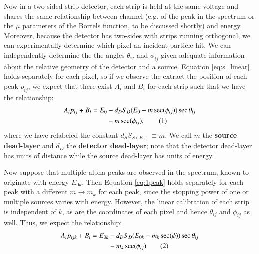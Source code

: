 \documentclass[11pt]{article}
\newcommand{\eqrefn}[1]{Equation \ref{eq:#1}}
\newcommand\numberthis{\addtocounter{equation}{1}\tag{\theequation}}
\begin{document}
\begin{multicols}{2}
Now in a two-sided strip-detector, each strip is held at the same voltage and shares the same relationship between channel (e.g. of the peak in the spectrum or the $\mu$ parameters of the Bortels function, to be discussed shortly) and energy. Moreover, because the detector has two-sides with strips running orthogonal, we can experimentally determine which pixel an incident particle hit. We can independently determine the  the angles $\theta_{ij}$ and $\phi_{ij}$ given adequate information about the relative geometry of the detector and a source. \eqrefn{s_linear} holds separately for each pixel, so if we observe the extract the position of each peak $p_{ij}$, we expect that there exist $A_i$ and $B_i$ for each strip such that we have the relationship:
	\begin{align*}
 		A_i p_{ij} + B_i = E_0  &-  d_D  S_D( E_0 - m \sec (\phi _{ij}) ) \sec \theta_{ij}
			\\ &- m  \sec (\phi_{ij}) ,
				  \numberthis \label{eq:1peak}
	\end{align*}	
where we have relabeled the constant $ d_S S_{S(E_0)} \equiv m $. We call $m$ the \textbf{source dead-layer} and $d_D$ the \textbf{detector dead-layer}; note that the detector dead-layer has units of distance while the source dead-layer has units of energy.

Now suppose that multiple alpha peaks are observed in the spectrum, known to originate with energy $E_{0k}$. Then \eqrefn{1peak} holds separately for each peak with a different $m\to m_k$ for each peak, since the stopping power of one or multiple sources varies with energy. However, the linear calibration of each strip is independent of $k$, as are the coordinates of each pixel and hence $\theta_{ij}$ and $\phi_{ij}$ as well. Thus, we expect the relationship:
	\begin{align*}
 		A_i p_{ijk} + B_i = E_{0k}  &-  d_D  S_D( E_{0k} - m_k \sec (\phi ) ) \sec \theta_{ij}
			\\ &- m_k \sec (\phi_{ij}) 
				  \numberthis \label{eq:fitfunction_1dataset}
	\end{align*}	
	

\end{multicols}
\end{document}
